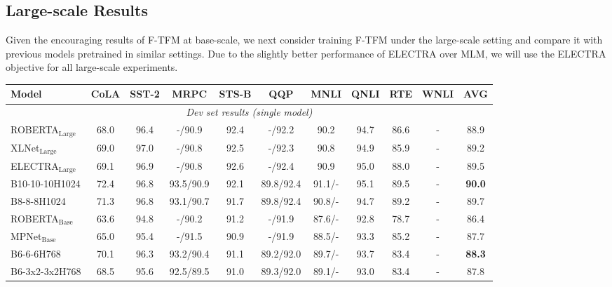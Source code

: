\documentclass{article}
\theoremstyle{custom}
\begin{document}
\subsection{Large-scale Results}
\label{sec:exp-large-scale}
Given the encouraging results of F-TFM at base-scale, we next consider training F-TFM under the large-scale setting and compare it with previous models pretrained in similar settings.
Due to the slightly better performance of ELECTRA over MLM, we will use the ELECTRA objective for all large-scale experiments.
\begin{table}[!ht]
	\centering
	\small
	\begin{tabular}{l|c@{\hskip 0.05in}c@{\hskip 0.05in}c@{\hskip 0.05in}c@{\hskip 0.05in}c@{\hskip 0.05in}c@{\hskip 0.05in}c@{\hskip 0.05in}c@{\hskip 0.05in}c@{\hskip 0.05in}|c}
		\toprule
		\bf Model & \bf CoLA & \bf SST-2 & \bf MRPC & \bf STS-B & \bf QQP & \bf MNLI & \bf QNLI & \bf RTE & \bf WNLI & \bf AVG  \\
		\midrule
		\multicolumn{11}{c}{\textit{Dev set results (single model)}} \\
		\midrule
		ROBERTA$_\text{Large}$~\cite{liu2019roberta}
		& 68.0 & 96.4 &   -/90.9  & 92.4 & -/92.2    & 90.2 & 94.7 & 86.6 & - & 88.9 \\
		XLNet$_\text{Large}$~\cite{yang2019xlnet}
		& 69.0 & 97.0 &   -/90.8  & 92.5 & -/92.3    & 90.8 & 94.9 & 85.9 & - & 89.2 \\
		ELECTRA$_\text{Large}$~\cite{clark2020electra}
		& 69.1 & 96.9 &   -/90.8  & 92.6 & -/92.4    & 90.9 & 95.0 & 88.0 & - & 89.5 \\
		B10-10-10H1024
		& 72.4 & 96.8 & 93.5/90.9 & 92.1 & 89.8/92.4 & 91.1/- & 95.1 & 89.5 & - & \bf 90.0 \\
		B8-8-8H1024
		& 71.3 & 96.8 & 93.1/90.7 & 91.7 & 89.8/92.4 & 90.8/- & 94.7 & 89.2 & - & 89.7 \\
		\cmidrule(r){1-1} \cmidrule(lr){2-10} \cmidrule(l){11-11}
		ROBERTA$_\text{Base}$~\cite{liu2019roberta}
		& 63.6 & 94.8 & -/90.2    & 91.2 & -/91.9    & 87.6/- & 92.8 & 78.7 & - & 86.4 \\
		MPNet$_\text{Base}$~\cite{song2020mpnet}
		& 65.0 & 95.4 & -/91.5    & 90.9 & -/91.9    & 88.5/- & 93.3 & 85.2 & - & 87.7 \\
		B6-6-6H768
		& 70.1 & 96.3 & 93.2/90.4 & 91.1 & 89.2/92.0 & 89.7/- & 93.7 & 83.4 & - & \bf 88.3 \\
		B6-3x2-3x2H768 
		& 68.5 & 95.6 & 92.5/89.5 & 91.0 & 89.3/92.0 & 89.1/- & 93.0 & 83.4 & - & 87.8 \\

\end{tabular}
\end{table}
\end{document}
